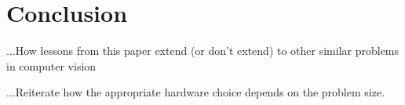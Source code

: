 \documentclass[10pt,twocolumn,letterpaper]{article}
\begin{document}


\section{Conclusion}
...How lessons from this paper extend (or don't extend) to other similar problems in computer vision

...Reiterate how the appropriate hardware choice depends on the problem size.

{\small


}
\end{document}
